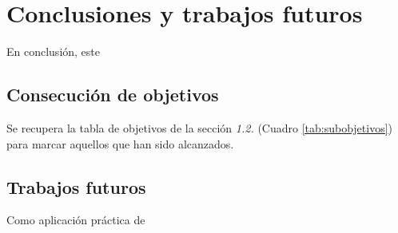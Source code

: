 \section{Conclusiones y trabajos futuros}

En conclusión, este

\subsection{Consecución de objetivos}

Se recupera la tabla de objetivos de la sección \textit{1.2.} (Cuadro \ref{tab:subobjetivos}) para marcar aquellos que han sido alcanzados.

\subsection{Trabajos futuros}

Como aplicación práctica de

